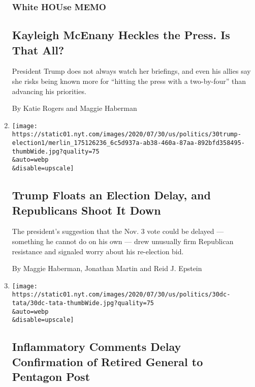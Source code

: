 \begin{enumerate}
{  \subsubsection{White HOUse MEMO}\label{white-house-memo}}

  \hypertarget{kayleigh-mcenany-heckles-the-press-is-that-all}{%
  \subsection{Kayleigh McEnany Heckles the Press. Is That
  All?}\label{kayleigh-mcenany-heckles-the-press-is-that-all}}

  President Trump does not always watch her briefings, and even his
  allies say she risks being known more for ``hitting the press with a
  two-by-four'' than advancing his priorities.

  By Katie Rogers and Maggie Haberman
\item
  \href{/2020/07/30/us/politics/trump-delay-2020-election.html}{}

  \texttt{[image: https://static01.nyt.com/images/2020/07/30/us/politics/30trump-election1/merlin\_175126236\_6c5d937a-ab38-460a-87aa-892bfd358495-thumbWide.jpg?quality=75\\\&auto=webp\\\&disable=upscale]}

  \hypertarget{trump-floats-an-election-delay-and-republicans-shoot-it-down}{%
  \subsection{Trump Floats an Election Delay, and Republicans Shoot It
  Down}\label{trump-floats-an-election-delay-and-republicans-shoot-it-down}}

  The president's suggestion that the Nov. 3 vote could be delayed ---
  something he cannot do on his own --- drew unusually firm Republican
  resistance and signaled worry about his re-election bid.

  By Maggie Haberman, Jonathan Martin and Reid J. Epstein
\item
  \href{/2020/07/30/us/politics/trump-inhofe-tata-pentagon.html}{}

  \texttt{[image: https://static01.nyt.com/images/2020/07/30/us/politics/30dc-tata/30dc-tata-thumbWide.jpg?quality=75\\\&auto=webp\\\&disable=upscale]}

  \hypertarget{inflammatory-comments-delay-confirmation-of-retired-general-to-pentagon-post}{%
  \subsection{Inflammatory Comments Delay Confirmation of Retired
  General to Pentagon
  Post}\label{inflammatory-comments-delay-confirmation-of-retired-general-to-pentagon-post}}


\end{enumerate}
